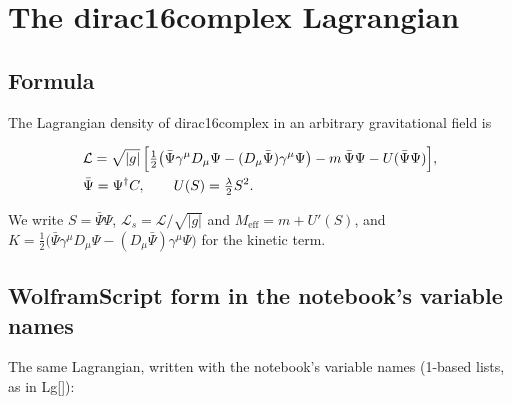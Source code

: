 \documentclass[11pt]{article}
\begin{document}
\section{The dirac16complex Lagrangian}

\subsection{Formula}

The Lagrangian density of dirac16complex in an arbitrary gravitational field is

\[
\begin{aligned}
&\mathcal L=\sqrt{|g|}\,\Bigl[\tfrac12\bigl(\bar\Psi\gamma^\mu D_\mu\Psi-(D_\mu\bar\Psi)\gamma^\mu\Psi\bigr)-m\,\bar\Psi\Psi-U(\bar\Psi\Psi)\Bigr],\\
&\bar\Psi=\Psi^\dagger C,\qquad U(S)=\tfrac\lambda2S^2 .
\end{aligned}
\]

We write $S=\bar\Psi\Psi$, $\mathcal L_s=\mathcal L/\sqrt{|g|}$ and $M_{\mathrm{eff}}=m+U'(S)$, and $K=\tfrac12\bigl(\bar\Psi\gamma^\mu D_\mu\Psi-(D_\mu\bar\Psi)\gamma^\mu\Psi\bigr)$ for the kinetic term.

\subsection{WolframScript form in the notebook's variable names}

The same Lagrangian, written with the notebook's variable names (1-based lists, as in Lg[]):
\end{document}

